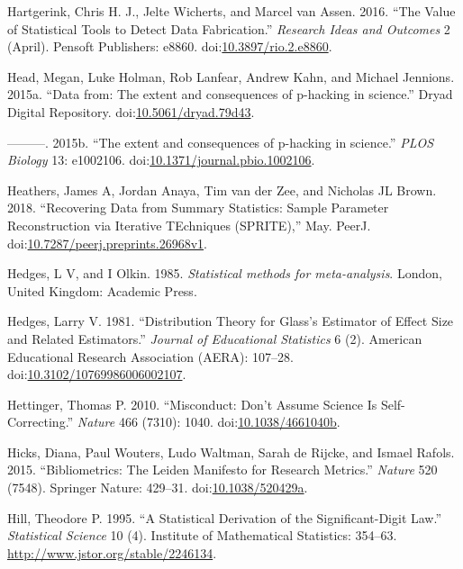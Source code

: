 \documentclass[a5paper]{book}
\begin{document}
\hypertarget{ref-doi:10.3897ux2frio.2.e8860}{}
Hartgerink, Chris H. J., Jelte Wicherts, and Marcel van Assen. 2016.
``The Value of Statistical Tools to Detect Data Fabrication.''
\emph{Research Ideas and Outcomes} 2 (April). Pensoft Publishers: e8860.
doi:\href{https://doi.org/10.3897/rio.2.e8860}{10.3897/rio.2.e8860}.

\hypertarget{ref-doi:10.5061ux2fdryad.79d43}{}
Head, Megan, Luke Holman, Rob Lanfear, Andrew Kahn, and Michael
Jennions. 2015a. ``Data from: The extent and consequences of p-hacking
in science.'' Dryad Digital Repository.
doi:\href{https://doi.org/10.5061/dryad.79d43}{10.5061/dryad.79d43}.

\hypertarget{ref-doi:10.1371ux2fjournal.pbio.1002106}{}
---------. 2015b. ``The extent and consequences of p-hacking in
science.'' \emph{PLOS Biology} 13: e1002106.
doi:\href{https://doi.org/10.1371/journal.pbio.1002106}{10.1371/journal.pbio.1002106}.

\hypertarget{ref-doi:10.7287ux2fpeerj.preprints.26968v1}{}
Heathers, James A, Jordan Anaya, Tim van der Zee, and Nicholas JL Brown.
2018. ``Recovering Data from Summary Statistics: Sample Parameter
Reconstruction via Iterative TEchniques (SPRITE),'' May. PeerJ.
doi:\href{https://doi.org/10.7287/peerj.preprints.26968v1}{10.7287/peerj.preprints.26968v1}.

\hypertarget{ref-Hedges1985-dy}{}
Hedges, L V, and I Olkin. 1985. \emph{Statistical methods for
meta-analysis}. London, United Kingdom: Academic Press.

\hypertarget{ref-doi:10.3102ux2f10769986006002107}{}
Hedges, Larry V. 1981. ``Distribution Theory for Glass's Estimator of
Effect Size and Related Estimators.'' \emph{Journal of Educational
Statistics} 6 (2). American Educational Research Association (AERA):
107--28.
doi:\href{https://doi.org/10.3102/10769986006002107}{10.3102/10769986006002107}.

\hypertarget{ref-doi:10.1038ux2f4661040b}{}
Hettinger, Thomas P. 2010. ``Misconduct: Don't Assume Science Is
Self-Correcting.'' \emph{Nature} 466 (7310): 1040.
doi:\href{https://doi.org/10.1038/4661040b}{10.1038/4661040b}.

\hypertarget{ref-doi:10.1038ux2f520429a}{}
Hicks, Diana, Paul Wouters, Ludo Waltman, Sarah de Rijcke, and Ismael
Rafols. 2015. ``Bibliometrics: The Leiden Manifesto for Research
Metrics.'' \emph{Nature} 520 (7548). Springer Nature: 429--31.
doi:\href{https://doi.org/10.1038/520429a}{10.1038/520429a}.

\hypertarget{ref-doi:10.2307ux2f2246134}{}
Hill, Theodore P. 1995. ``A Statistical Derivation of the
Significant-Digit Law.'' \emph{Statistical Science} 10 (4). Institute of
Mathematical Statistics: 354--63.
\url{http://www.jstor.org/stable/2246134}.
\end{document}

